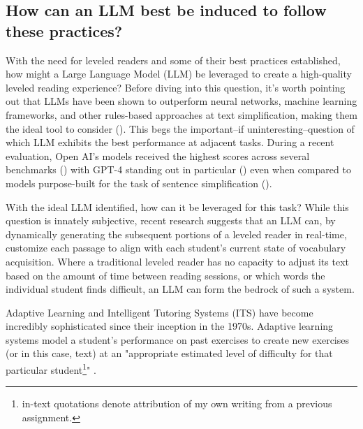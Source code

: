 \documentclass[
	letterpaper, %
]{jdf}
\newcommand{\pcite}[1]{(\cite{#1})}
\begin{document}
\subsection{How can an LLM best be induced to follow these practices?}

With the need for leveled readers and some of their best practices established, how might a Large Language Model (LLM) be leveraged to create a high-quality leveled reading experience? Before diving into this question, it's worth pointing out that LLMs have been shown to outperform neural networks, machine learning frameworks, and other rules-based approaches at text simplification, making them the ideal tool to consider \pcite{feng2023sentence}. This begs the important–if uninteresting–question of which LLM exhibits the best performance at adjacent tasks. During a recent evaluation, Open AI's models received the highest scores across several benchmarks \pcite{kew2023bless} with GPT-4 standing out in particular \pcite{wu2024indepth} even when compared to models purpose-built for the task of sentence simplification \pcite{ai_human_taking_turns_creating_story}.

With the ideal LLM identified, how can it be leveraged for this task? While this question is innately subjective, recent research suggests that an LLM can, by dynamically generating the subsequent portions of a leveled reader in real-time, customize each passage to align with each student's current state of vocabulary acquisition. Where a traditional leveled reader has no capacity to adjust its text based on the amount of time between reading sessions, or which words the individual student finds difficult, an LLM can form the bedrock of such a system.

Adaptive Learning and Intelligent Tutoring Systems (ITS) have become incredibly sophisticated since their inception in the 1970s. Adaptive learning systems model a student's performance on past exercises to create new exercises (or in this case, text) at an "appropriate estimated level of difficulty for that particular student\footnote{in-text quotations denote attribution of my own writing from a previous assignment.}" \cite{important_adaptive_learning_exercise_generation}.
\end{document}
